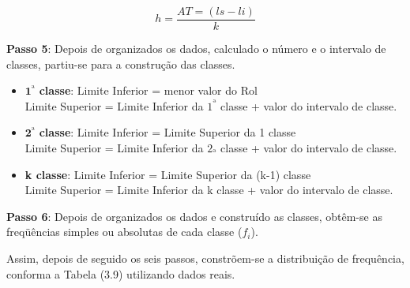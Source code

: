 $$ h = \frac{AT=(ls-li)}{k}$$


\textbf{Passo 5}: Depois de organizados os dados, calculado o número e o intervalo de classes, partiu-se para a construção das classes.


\begin{itemize}
  \item $\textbf{1}^{ª}$ \textbf{classe}: Limite Inferior = menor valor do Rol\\
  Limite Superior = Limite Inferior da $1^{ª}$ classe + valor do intervalo de classe.
  \item $\textbf{2}^{ª}$ \textbf{classe}: Limite Inferior = Limite Superior da 1 classe\\
  Limite Superior = Limite Inferior da $2_{ª}$ classe + valor do intervalo de classe.
  \item \textbf{k classe}: Limite Inferior = Limite Superior da (k-1) classe\\
               Limite Superior = Limite Inferior da k classe + valor do intervalo de classe.
\end{itemize}



\textbf{Passo 6}: Depois de organizados os dados e construído as classes, obtêm-se as freqüências simples ou absolutas de cada classe ($f_{i}$).\vskip0.3cm

Assim, depois de seguido os seis passos, constrõem-se a distribuição de frequência, conforma a Tabela (3.9) utilizando dados reais.


\begin{table}[!htb]
\end{table}
\vskip0.1cm

